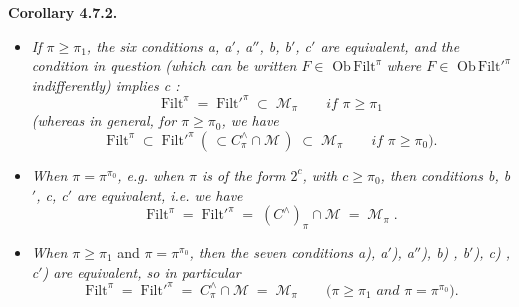 \documentclass[11pt]{article}
\newcommand{\Mc}{\mathcal{M}}
\begin{document}
\textbf{Corollary 4.7.2.}
\begin{itemize}[leftmargin=4em]
\item[\textit{1°)}] \textit{If $\pi \geqslant \pi_1$, the six conditions a, a$'$, a$''$, b, b$'$, c$'$ are equivalent, and the condition in question (which can be written $F \in$} $\mathrm{Ob}\,\mathrm{Filt}^{\pi}$ \textit{where $F \in$} $\mathrm{Ob}\,\mathrm{Filt}'^{\pi}$ \textit{indifferently) implies c :} %
\[
\mathrm{Filt}^{\pi} \;=\; \mathrm{Filt}'^{\pi} \;\subset\; \Mc_{\pi} \qquad \textit{if } \pi \geqslant \pi_1 \tag*{(4.7.2.1)}
\]
\textit{(whereas in general, for $\pi \geqslant \pi_0$, we have}
\[
\mathrm{Filt}^{\pi} \;\subset\; \mathrm{Filt}'^{\pi}\ (\,\subset C^{\wedge}_{\pi} \cap \Mc\,) \;\subset\; \Mc_{\pi} \qquad \textit{if } \pi \geqslant \pi_0\textit{).} \tag*{(4.7.2.2)}
\]
\item[\textit{2°)}] \textit{When $\pi = \pi^{\pi_0}$, e.g. when $\pi$ is of the form $2^{c}$, with $c \geqslant \pi_0$, then conditions b, b$'$, c, c$'$ are equivalent, i.e. we have}
\[
\mathrm{Filt}^{\pi} \;=\; \mathrm{Filt}'^{\pi} \;=\; (C^{\wedge})_{\pi} \cap \Mc \;=\; \Mc_{\pi}\;. \tag*{(4.7.3.2)} %
\]
\item[\textit{3°)}] \textit{When $\pi \geqslant \pi_1$} and \textit{$\pi = \pi^{\pi_0}$, then the seven conditions a), a$'$), a$''$), b) , b$'$), c) , c$'$) are equivalent, so in particular}
\[
\mathrm{Filt}^{\pi} \;=\; \mathrm{Filt}'^{\pi} \;=\; C^{\wedge}_{\pi} \cap \Mc \;=\; \Mc_{\pi} \qquad (\pi \geqslant \pi_1 \textit{ and } \pi = \pi^{\pi_0}\textit{).} \tag*{(4.7.2.4)}
\]
\end{itemize}
\end{document}
